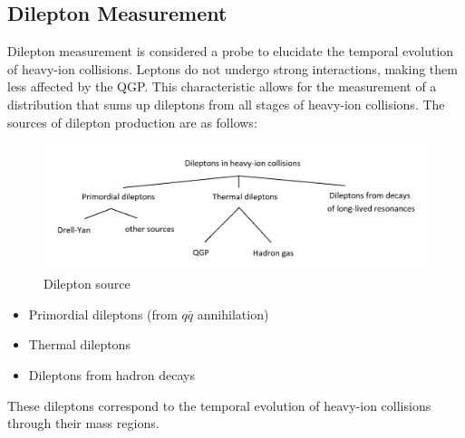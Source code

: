     \subsection{Dilepton Measurement\cite{Geurts:2022xmk}}

        Dilepton measurement is considered a probe to elucidate the temporal evolution of heavy-ion collisions. Leptons do not undergo strong interactions, making them less affected by the QGP. This characteristic allows for the measurement of a distribution that sums up dileptons from all stages of heavy-ion collisions. The sources of dilepton production are as follows:  
        
        \begin{figure}[hbtp]
            \centering
            \includegraphics[keepaspectratio, scale=0.3]{fig/1_5_dilepton_source.png}
            \caption{Dilepton source}
            \label{Intro:Dilepton:dilepton_source}
        \end{figure}
        
        \begin{itemize}
            \item Primordial dileptons (from \(q\bar{q}\) annihilation)
            \item Thermal dileptons
            \item Dileptons from hadron decays
        \end{itemize}
        
        These dileptons correspond to the temporal evolution of heavy-ion collisions through their mass regions.  
        

